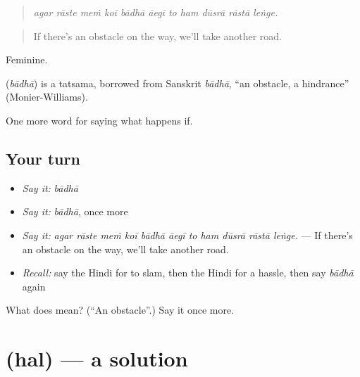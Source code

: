 \begin{quote}
          
\end{quote}

\begin{quote}
\emph{agar rāste meṁ koī bādhā āegī to ham dūsrā rāstā leṅge.}
\end{quote}

\begin{quote}
If there's an obstacle on the way, we'll take another road.
\end{quote}

Feminine.

\begin{cousinweb}
\textbf{} (\emph{bādhā}) is a tatsama, borrowed from Sanskrit \emph{bādhā}, \textquotedblleft{}an obstacle, a hindrance\textquotedblright{} (Monier-Williams).
\end{cousinweb}

\begin{grammarlens}[title={What you've built}]
One more word for saying what happens if.
\end{grammarlens}

\subsection*{Your turn}
\begin{itemize}
\raggedright
  \item \emph{Say it:} \emph{bādhā}
  \item \emph{Say it:} \emph{bādhā}, once more
  \item \emph{Say it:} \emph{agar rāste meṁ koī bādhā āegī to ham dūsrā rāstā leṅge.} — If there's an obstacle on the way, we'll take another road.
  \item \emph{Recall:} say the Hindi for to slam, then the Hindi for a hassle, then say \emph{bādhā} again
\end{itemize}

\begin{tcolorbox}[breakable,colback=teal!4,colframe=teal!35!black,title={Before you move on}]
What does  mean? (\textquotedblleft{}An obstacle\textquotedblright{}.) Say it once more.
\end{tcolorbox}
\section[\texorpdfstring{\hi{हल} (hal)}{हल (hal)}]{ (hal) — a solution}

